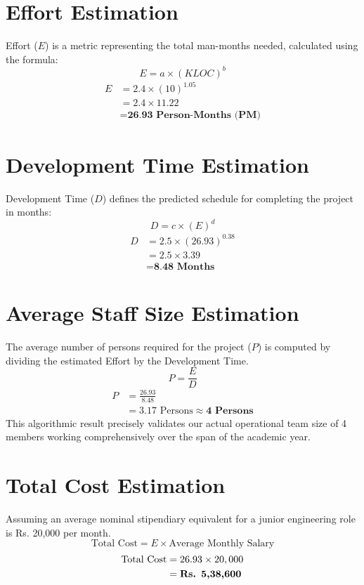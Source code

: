 \documentclass[12pt,a4paper,oneside]{report}
\theoremstyle{definition}
\theoremstyle{remark}
\begin{document}
\begin{appendices}
\section{Effort Estimation}
Effort ($E$) is a metric representing the total man-months needed, calculated using the formula:
\begin{equation}
    E = a \times (KLOC)^b
\end{equation}
\begin{align*}
    E &= 2.4 \times (10)^{1.05} \\
    &= 2.4 \times 11.22 \\
    &= \textbf{26.93 Person-Months (PM)}
\end{align*}

\section{Development Time Estimation}
Development Time ($D$) defines the predicted schedule for completing the project in months:
\begin{equation}
    D = c \times (E)^d
\end{equation}
\begin{align*}
    D &= 2.5 \times (26.93)^{0.38} \\
    &= 2.5 \times 3.39 \\
    &= \textbf{8.48 Months}
\end{align*}

\section{Average Staff Size Estimation}
The average number of persons required for the project ($P$) is computed by dividing the estimated Effort by the Development Time.
\begin{equation}
    P = \frac{E}{D}
\end{equation}
\begin{align*}
    P &= \frac{26.93}{8.48} \\
    &= 3.17 \text{ Persons} \approx \textbf{4 Persons}
\end{align*}
This algorithmic result precisely validates our actual operational team size of 4 members working comprehensively over the span of the academic year.

\section{Total Cost Estimation}
Assuming an average nominal stipendiary equivalent for a junior engineering role is Rs. 20,000 per month.
\begin{equation}
    \text{Total Cost} = E \times \text{Average Monthly Salary}
\end{equation}
\begin{align*}
    \text{Total Cost} &= 26.93 \times 20,000 \\
    &= \text{\textbf{Rs. 5,38,600}}
\end{align*}


\end{appendices}
\end{document}

